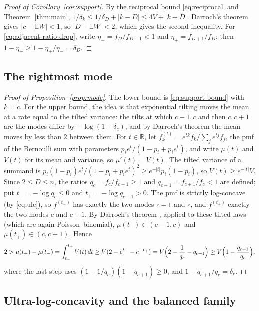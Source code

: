 \documentclass[ECP]{ejpecp}
\begin{document}
\begin{proof}[Proof of Corollary~\ref{cor:support}]
  By the reciprocal bound \eqref{eq:reciprocal} and Theorem~\ref{thm:main},
  $1/\delta_k\leq1/\delta_D+|k-D|\leq4V+|k-D|$. Darroch's theorem \cite[Theorem~4]{darroch1964} gives
  $|c-\mathbb EW|<1$, so $|D-\mathbb EW|<2$, which gives the second
  inequality. For \eqref{eq:adjacent-ratio-drop}, write
  $\eta_-=f_D/f_{D-1}<1$ and $\eta_+=f_{D+1}/f_D$; then
  $1-\eta_+\geq1-\eta_+/\eta_-=\delta_D$.
\end{proof}

\subsection{The rightmost mode}

\begin{proof}[Proof of Proposition~\ref{prop:mode}]
  The lower bound is \eqref{eq:support-bound} with $k=c$. For the upper
  bound, the idea is that exponential tilting moves the mean at a rate equal
  to the tilted variance: the tilts at which $c-1,c$ and then $c,c+1$ are the
  modes differ by $-\log(1-\delta_c)$, and by Darroch's theorem the mean moves
  by less than $2$ between them. For
  $t\in\mathbb R$, let $f^{(t)}_k=e^{tk}f_k/\sum_je^{tj}f_j$, the pmf of the Bernoulli sum
  with parameters $p_ie^t/(1-p_i+p_ie^t)$, and write $\mu(t)$ and $V(t)$ for
  its mean and variance, so $\mu'(t)=V(t)$. The tilted variance of a summand
  is $p_i(1-p_i)e^t/(1-p_i+p_ie^t)^2\geq e^{-|t|}p_i(1-p_i)$, so
  $V(t)\geq e^{-|t|}V$. Since $2\leq D\leq n$, the ratios $q_c=f_c/f_{c-1}\geq1$
  and $q_{c+1}=f_{c+1}/f_c<1$ are defined; put $t_-=-\log q_c\leq0$ and
  $t_+=-\log q_{c+1}>0$. The pmf is strictly log-concave (by \eqref{eq:ulc}), so $f^{(t_-)}$ has exactly the two modes $c-1$ and $c$, and
  $f^{(t_+)}$ exactly the two modes $c$ and $c+1$. By Darroch's theorem
  \cite[Theorem~4]{darroch1964}, applied to these tilted laws (which are again Poisson--binomial),
  $\mu(t_-)\in(c-1,c)$ and $\mu(t_+)\in(c,c+1)$. Hence
  \[
    2>\mu(t_+)-\mu(t_-)=\int_{t_-}^{t_+}V(t)\,dt\geq V(2-e^{t_-}-e^{-t_+})
    =V\Bigl(2-\frac1{q_c}-q_{c+1}\Bigr)\geq V\Bigl(1-\frac{q_{c+1}}{q_c}\Bigr),
  \]
  where the last step uses $(1-1/q_c)(1-q_{c+1})\geq0$, and
  $1-q_{c+1}/q_c=\delta_c$.
\end{proof}

\subsection{Ultra-log-concavity and the balanced family}\label{sec:balanced}
\end{document}
